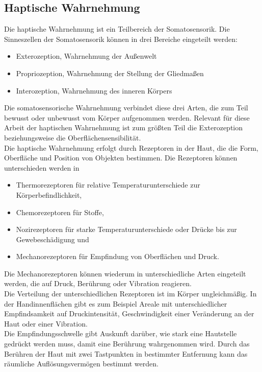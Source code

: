 \subsection{Haptische Wahrnehmung}
Die haptische Wahrnehmung ist ein Teilbereich der Somatosensorik. Die Sinneszellen der Somatosensorik können in drei Bereiche eingeteilt werden:
\begin{itemize}
	\item Exterozeption, Wahrnehmung der Außenwelt
	\item Propriozeption, Wahrnehmung der Stellung der Gliedmaßen
	\item Interozeption, Wahrnehmung des inneren Körpers
\end{itemize}
Die somatosensorische Wahrnehmung verbindet diese drei Arten, die zum Teil bewusst oder unbewusst vom Körper aufgenommen werden. Relevant für diese Arbeit der haptischen Wahrnehmung ist zum größten Teil die Exterozeption beziehungsweise die Oberflächensensibilität. \cite[Vgl. Seite 26]{Sprenger.2020}\\
Die haptische Wahrnehmung erfolgt durch Rezeptoren in der Haut, die die Form, Oberfläche und Position von Objekten bestimmen. Die Rezeptoren können unterschieden werden in
\begin{itemize}
	\item Thermorezeptoren für relative Temperaturunterschiede zur Körperbefindlichkeit, 
	\item Chemorezeptoren für Stoffe,
	\item Nozirezeptoren für starke Temperaturunterschiede oder Drücke bis zur Gewebeschädigung und
	\item Mechanorezeptoren für Empfindung von Oberflächen und Druck.
\end{itemize}
Die Mechanorezeptoren können wiederum in unterschiedliche Arten eingeteilt werden, die auf Druck, Berührung oder Vibration reagieren. \cite[Vgl. Seite 26 f.]{Sprenger.2020}\\
Die Verteilung der unterschiedlichen Rezeptoren ist im Körper ungleichmäßig. In der Handinnenflächen gibt es zum Beispiel Areale mit unterschiedlicher Empfindsamkeit \glqq auf Druckintensität, Geschwindigkeit einer Veränderung an der Haut oder einer Vibration. \grqq{} \cite[Seite 29]{Sprenger.2020}\\
Die Empfindungsschwelle gibt Auskunft darüber, wie stark eine Hautstelle gedrückt werden muss, damit eine Berührung wahrgenommen wird. Durch das Berühren der Haut mit zwei Tastpunkten in bestimmter Entfernung kann das räumliche Auflösungsvermögen bestimmt werden. \cite[Vgl. Seite 28]{Sprenger.2020}\\
